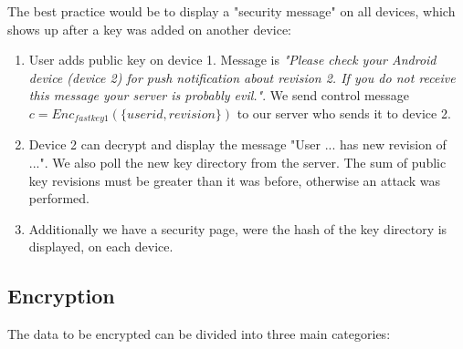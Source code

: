 \documentclass{scrartcl}
\begin{document}
The best practice would be to display a "security message" on all devices, which shows up after a key was added on another device:
\begin{enumerate}
\item User adds public key on device 1. Message is \textit{"Please check your Android device (device 2) for push notification about revision 2. If you do not receive this message your server is probably evil."}. We send control message $c = Enc_{fastkey1}(\lbrace userid, revision\rbrace )$ to our server who sends it to device 2.
\item  Device 2 can decrypt and display the message "User ... has new revision of ...". We also poll the new key directory from the server. The sum of public key revisions must be greater than it was before, otherwise an attack was performed. 
\item Additionally we have a security page, were the hash of the key directory is displayed, on each device.
\end{enumerate}






  
 \subsection{Encryption}
The data to be encrypted can be divided into three main categories:
\end{document}

